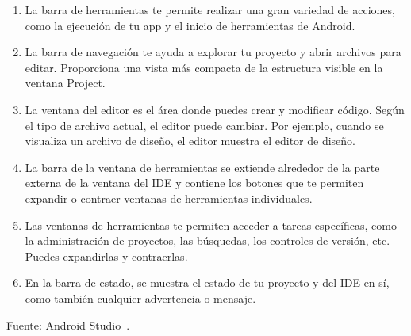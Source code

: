 \begin{enumerate}
\item La barra de herramientas te permite realizar una gran
 variedad de acciones, como la ejecución de tu app y el inicio
 de herramientas de Android.
\item La barra de navegación te ayuda a explorar tu 
proyecto y abrir archivos para editar. Proporciona una 
vista más compacta de la estructura visible en la ventana Project.
\item La ventana del editor es el área donde puedes 
crear y modificar código. Según el tipo de archivo actual,
 el editor puede cambiar. Por ejemplo, cuando se visualiza
 un archivo de diseño, el editor muestra el editor de diseño.
\item La barra de la ventana de herramientas se extiende 
alrededor de la parte externa de la ventana del IDE y 
contiene los botones que te permiten expandir o contraer
 ventanas de herramientas individuales.
\item Las ventanas de herramientas te permiten acceder a 
tareas específicas, como la administración de proyectos,
 las búsquedas, los controles de versión, etc. Puedes 
expandirlas y contraerlas.
\item En la barra de estado, se muestra el estado de tu 
proyecto y del IDE en sí, como también cualquier advertencia 
o mensaje.
\end{enumerate}

Fuente: Android Studio~\cite{ANDROIDSTUDIO}.